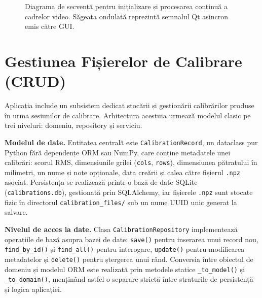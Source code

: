 \begin{figure}[htbp]
\caption{Diagrama de secvență pentru inițializare și procesarea continuă a cadrelor video. Săgeata ondulată reprezintă semnalul Qt asincron emis către GUI.}
\label{fig:seqdiagram}
\end{figure}

\section{Gestiunea Fișierelor de Calibrare (CRUD)}
\label{sec:crud}

Aplicația include un subsistem dedicat stocării și gestionării calibrărilor produse în urma sesiunilor de calibrare. Arhitectura acestuia urmează modelul clasic pe trei niveluri: domeniu, repository și serviciu.

\textbf{Modelul de date.} Entitatea centrală este \texttt{CalibrationRecord}, un dataclass pur Python fără dependențe ORM sau NumPy, care conține metadatele unei calibrări: scorul RMS, dimensiunile grilei (\texttt{cols}, \texttt{rows}), dimensiunea pătratului în milimetri, un nume și note opționale, data creării și calea către fișierul \texttt{.npz} asociat. Persistența se realizează printr-o bază de date SQLite (\texttt{calibrations.db}), gestionată prin SQLAlchemy, iar fișierele \texttt{.npz} sunt stocate fizic în directorul \texttt{calibration\_files/} sub un nume UUID unic generat la salvare.

\textbf{Nivelul de acces la date.} Clasa \texttt{CalibrationRepository} implementează operațiile de bază asupra bazei de date: \texttt{save()} pentru inserarea unui record nou, \texttt{find\_by\_id()} și \texttt{find\_all()} pentru interogare, \texttt{update()} pentru modificarea metadatelor și \texttt{delete()} pentru ștergerea unui rând. Conversia între obiectul de domeniu și modelul ORM este realizată prin metodele statice \texttt{\_to\_model()} și \texttt{\_to\_domain()}, menținând astfel o separare strictă între straturile de persistență și logica aplicației.

